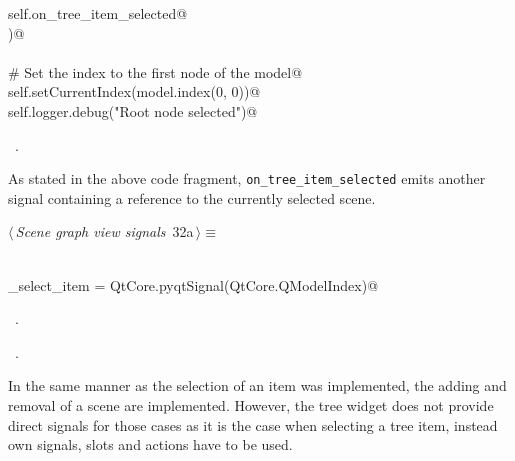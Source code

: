\documentclass[
    a4paper,      %
    10pt,         %
    openright,    %
    notitlepage,  %
    parskip=half, %
]{scrreprt}       %
\theoremstyle{definition}                    %
\begin{document}
\begin{flushleft}
\begin{minipage}{\linewidth}
\begin{list}{}{}
\mbox{}\lstinline@        self.on_tree_item_selected@\\
\mbox{}\lstinline@    )@\\
\mbox{}\lstinline@@\\
\mbox{}\lstinline@    # Set the index to the first node of the model@\\
\mbox{}\lstinline@    self.setCurrentIndex(model.index(0, 0))@\\
\mbox{}\lstinline@    self.logger.debug("Root node selected")@{\NWsep}
\end{list}
\vspace{-1.5ex}
\footnotesize
\begin{list}{}{\setlength{\itemsep}{-\parsep}\setlength{\itemindent}{-\leftmargin}}
\item \NWtxtMacroRefIn\ .

\item{}
\end{list}
\end{minipage}\vspace{4ex}
\end{flushleft}
As stated in the above code fragment, \verb+on_tree_item_selected+ emits another
signal containing a reference to the currently selected scene.

\begin{flushleft} \small
\begin{minipage}{\linewidth}\label{scrap36}\raggedright\small
{} $\langle\,${\itshape Scene graph view signals}\nobreak\ {\footnotesize {32a}}$\,\rangle\equiv$
\vspace{-1exm}
\begin{list}{}{} \item
\mbox{}\lstinline@@\\
\mbox{}\lstinline@do_select_item = QtCore.pyqtSignal(QtCore.QModelIndex)@\\
\mbox{}\lstinline@@{\NWsep}
\end{list}
\vspace{-1.5ex}
\footnotesize
\begin{list}{}{\setlength{\itemsep}{-\parsep}\setlength{\itemindent}{-\leftmargin}}
\item \NWtxtMacroDefBy\ .
\item \NWtxtMacroRefIn\ .

\item{}
\end{list}
\end{minipage}\vspace{4ex}
\end{flushleft}
In the same manner as the selection of an item was implemented, the adding and
removal of a scene are implemented. However, the tree widget does not provide
direct signals for those cases as it is the case when selecting a tree item,
instead own signals, slots and actions have to be used.
\end{document}
